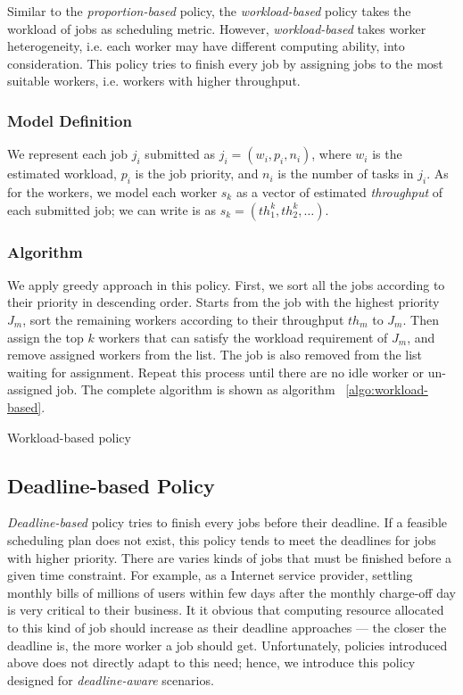 
Similar to the {\em proportion-based} policy, the {\em workload-based}
policy takes the workload of jobs as scheduling metric.
However, {\em workload-based} takes worker heterogeneity, i.e. each
worker may have different computing ability, into consideration.
This policy tries to finish every job by assigning jobs to the most 
suitable workers, i.e. workers with higher throughput.

\subsubsection{Model Definition}

We represent each job $j_i$ submitted as $j_i = (w_i, p_i, n_i)$, where
$w_i$ is the estimated workload, $p_i$ is the job priority, and $n_i$
is the number of tasks in $j_i$.
As for the workers, we model each worker $s_k$ as a vector of estimated
{\em throughput} of each submitted job; we can write is as $s_k =
(th^k_1, th^k_2, \ldots)$.

\subsubsection{Algorithm}

We apply greedy approach in this policy.
First, we sort all the jobs according to their priority in descending
order.
Starts from the job with the highest priority $J_m$, sort the remaining
workers according to their throughput $th_m$ to $J_m$.
Then assign the top $k$ workers that can satisfy the workload
requirement of $J_m$, and remove assigned workers from the list.
The job is also removed from the list waiting for assignment.
Repeat this process until there are no idle worker or un-assigned job.
The complete algorithm is shown as algorithm ~\ref{algo:workload-based}.

\begin{algorithm}[htbp]

\caption{Workload-based policy}
\label{algo:workload-based}
\end{algorithm}


\subsection{Deadline-based Policy}	%

{\em Deadline-based} policy tries to finish every jobs before their 
deadline.
If a feasible scheduling plan does not exist, this policy tends to meet
the deadlines for jobs with higher priority.
There are varies kinds of jobs that must be finished before a given 
time constraint.
For example, as a Internet service provider, settling monthly bills of
millions of users within few days after the monthly charge-off day is
very critical to their business.
It it obvious that computing resource allocated to this kind of job 
should increase as their deadline approaches --- the closer the 
deadline is, the more worker a job should get.
Unfortunately, policies introduced above does not directly adapt to 
this need; hence, we introduce this policy designed for
{\em deadline-aware} scenarios.

